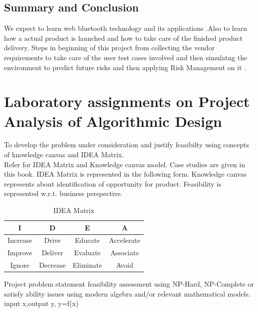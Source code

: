 \documentclass[oneside,a4paper,12pt]{report}
\begin{document}
\begin{appendices}
\section{Summary and Conclusion}
We expect to learn web bluetooth technology and its applications .Also to learn how a actual product is launched and how to take care of the finished product delivery.
Steps in beginning of  this project from collecting the vendor requirements to take  care of the user test cases involved and then simulatng the environment to predict future risks and then applying Risk Management on it .


\chapter{Laboratory assignments on Project Analysis of Algorithmic Design}

To develop the problem under consideration and justify feasibilty using
concepts of knowledge canvas and IDEA Matrix.\\
Refer \cite{innovationbook} for IDEA Matrix and Knowledge canvas model. Case studies are given in this book. IDEA Matrix is represented in the following form. Knowledge canvas represents about identification  of opportunity for product. Feasibility is represented w.r.t. business perspective.\\ 

\begin{table}[!htbp]
\begin{center}
  \begin{tabular}{| c | c | c | c |}
\hline
 I & D & E & A \\ 
\hline
Increase & Drive & Educate & Accelerate \\
\hline
Improve & Deliver & Evaluate & Associate  \\
 \hline
Ignore & Decrease & Eliminate & Avoid \\
\hline
\end{tabular}
 \caption { IDEA Matrix }
 \label{tab:imatrix}
\end{center}
\end{table}

Project problem statement feasibility assessment using NP-Hard, NP-Complete or satisfy ability issues using modern algebra and/or relevant mathematical models.
 input x,output y, y=f(x)












\end{appendices}
\end{document}
